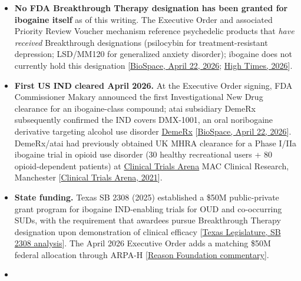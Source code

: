 \begin{itemize}
\tightlist
\item
  \textbf{No FDA Breakthrough Therapy designation has been granted for ibogaine itself} as of this writing. The Executive Order and associated Priority Review Voucher mechanism reference psychedelic products that \emph{have received} Breakthrough designations (psilocybin for treatment-resistant depression; LSD/MM120 for generalized anxiety disorder); ibogaine does not currently hold this designation {[}\href{https://www.biospace.com/drug-development/trumps-psychedelics-push-a-mixed-blessing-for-neuropsychiatric-companies-patients}{BioSpace, April 22, 2026}; \href{https://hightimes.com/news/politics/it-took-a-text-from-joe-rogan-now-psychedelics-are-a-federal-research-priority/}{High Times, 2026}{]}.
\item
  \textbf{First US IND cleared April 2026.} At the Executive Order signing, FDA Commissioner Makary announced the first Investigational New Drug clearance for an ibogaine-class compound; atai subsidiary DemeRx subsequently confirmed the IND covers DMX-1001, an oral noribogaine derivative targeting alcohol use disorder \href{https://www.demerx.com/the-science/}{DemeRx} {[}\href{https://www.biospace.com/drug-development/trumps-psychedelics-push-a-mixed-blessing-for-neuropsychiatric-companies-patients}{BioSpace, April 22, 2026}{]}. DemeRx/atai had previously obtained UK MHRA clearance for a Phase I/IIa ibogaine trial in opioid use disorder (30 healthy recreational users + 80 opioid-dependent patients) at \href{https://www.clinicaltrialsarena.com/news/ibogaine-demerx-atai-mhra-clinical-trial/}{Clinical Trials Arena} MAC Clinical Research, Manchester {[}\href{https://www.clinicaltrialsarena.com/news/ibogaine-demerx-atai-mhra-clinical-trial/}{Clinical Trials Arena, 2021}{]}.
\item
  \textbf{State funding.} Texas SB 2308 (2025) established a \$50M public-private grant program for ibogaine IND-enabling trials for OUD and co-occurring SUDs, with the requirement that awardees pursue Breakthrough Therapy designation upon demonstration of clinical efficacy {[}\href{https://capitol.texas.gov/tlodocs/89R/analysis/html/SB02308I.htm}{Texas Legislature, SB 2308 analysis}{]}. The April 2026 Executive Order adds a matching \$50M federal allocation through ARPA-H {[}\href{https://reason.org/commentary/trumps-executive-order-accelerate-widespread-access-psychedelic-therapies/}{Reason Foundation commentary}{]}.
\item

\end{itemize}
